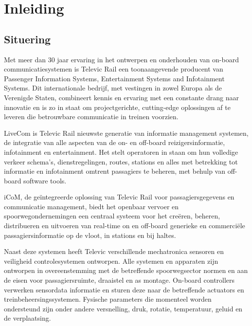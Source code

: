 \chapter{Inleiding}\label{hfdst:situering}
\section{Situering}
Met meer dan 30 jaar ervaring in het ontwerpen en onderhouden van on-board communicatiesystemen is Televic Rail een toonaangevende producent van Passenger Information Systems, Entertainment Systems and Infotainment Systems.
Dit internationale bedrijf, met vestingen in zowel Europa als de Verenigde Staten, combineert kennis en ervaring met een constante drang naar innovatie en is zo in staat om projectgerichte, cutting-edge oplossingen af te leveren die betrouwbare communicatie in treinen voorzien.

LiveCom is Televic Rail nieuwste generatie van informatie management systemen, de integratie van alle aspecten van de on- en off-board reizigersinformatie, infotainment en entertainment. 
Het stelt operatoren in staan om hun volledige verkeer schema's, dienstregelingen, routes, stations en alles met betrekking tot informatie en infotainment omtrent passagiers te beheren, met behulp van off-board software tools.

iCoM, de geïntegreerde oplossing van Televic Rail voor passagiersgegevens en communicatie management, biedt het openbaar vervoer en spoorwegondernemingen een centraal systeem voor het creëren, beheren, distribueren en uitvoeren van real-time on en off-board generieke en commerciële passagiersinformatie op de vloot, in stations en bij haltes.

Naast deze systemen heeft Televic verschillende mechatronica sensoren en veiligheid controlesystemen ontworpen.
Alle systemen en apparaten zijn ontworpen in overeenstemming met de betreffende spoorwegsector normen en aan de eisen voor passagiersruimte, draaistel en as montage. 
On-board controllers verwerken sensordata informatie en sturen deze naar de betreffende actuators en treinbeheersingssystemen.
Fysische parameters die momenteel worden ondersteund zijn onder andere versnelling, druk, rotatie, temperatuur, geluid en de verplaatsing.

